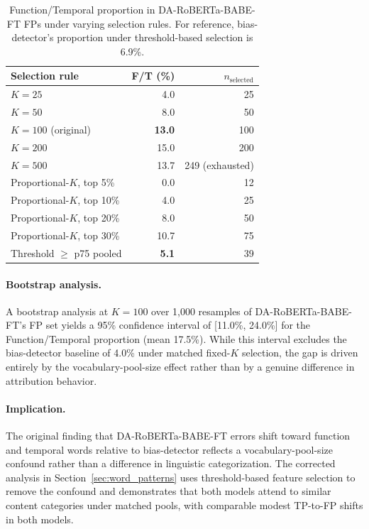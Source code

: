 \documentclass[11pt]{article}
\begin{document}
\begin{table}[h]
\centering
\small
\begin{tabular}{lrr}
\toprule
Selection rule & F/T (\%) & $n_{\text{selected}}$ \\
\midrule
$K{=}25$  & 4.0  & 25  \\
$K{=}50$  & 8.0  & 50  \\
$K{=}100$ (original) & \textbf{13.0} & 100 \\
$K{=}200$ & 15.0 & 200 \\
$K{=}500$ & 13.7 & 249 (exhausted) \\
\midrule
Proportional-$K$, top 5\%  & 0.0  & 12 \\
Proportional-$K$, top 10\% & 4.0  & 25 \\
Proportional-$K$, top 20\% & 8.0  & 50 \\
Proportional-$K$, top 30\% & 10.7 & 75 \\
\midrule
Threshold $\geq$ p75 pooled & \textbf{5.1} & 39 \\
\bottomrule
\end{tabular}
\caption{Function/Temporal proportion in DA-RoBERTa-BABE-FT FPs under 
varying selection rules. For reference, bias-detector's proportion 
under threshold-based selection is 6.9\%.}
\label{tab:vocab_sensitivity}
\end{table}

\paragraph{Bootstrap analysis.} A bootstrap analysis at $K{=}100$ over 
1{,}000 resamples of DA-RoBERTa-BABE-FT's FP set yields a 95\% 
confidence interval of [11.0\%, 24.0\%] for the Function/Temporal 
proportion (mean 17.5\%). While this interval excludes the 
bias-detector baseline of 4.0\% under matched fixed-$K$ selection, 
the gap is driven entirely by the vocabulary-pool-size effect rather 
than by a genuine difference in attribution behavior.

\paragraph{Implication.} The original finding that DA-RoBERTa-BABE-FT 
errors shift toward function and temporal words relative to 
bias-detector reflects a vocabulary-pool-size confound rather than a 
difference in linguistic categorization. The corrected analysis in 
Section~\ref{sec:word_patterns} uses threshold-based feature selection 
to remove the confound and demonstrates that both models attend to 
similar content categories under matched pools, with comparable 
modest TP-to-FP shifts in both models.
\end{document}
